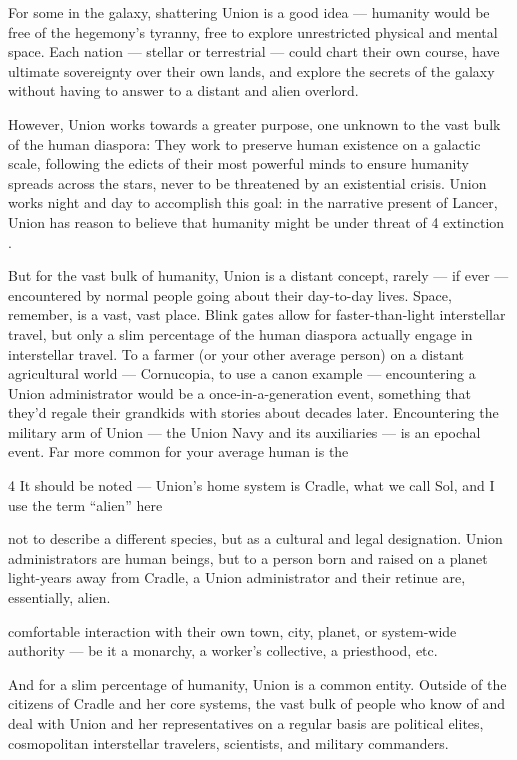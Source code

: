For some in the galaxy, shattering Union is a good idea — humanity would be free of the
hegemony’s tyranny, free to explore unrestricted physical and mental space. Each nation —
stellar or terrestrial — could chart their own course, have ultimate sovereignty over their own
lands, and explore the secrets of the galaxy without having to answer to a distant and alien
overlord.


However, Union works towards a greater purpose, one unknown to the vast bulk of the human
diaspora: They work to preserve human existence on a galactic scale, following the edicts of
their most powerful minds to ensure humanity spreads across the stars, never to be threatened
by an existential crisis. Union works night and day to accomplish this goal: in the narrative
present of Lancer, Union has reason to believe that humanity might be under threat of
            4
extinction  .

But for the vast bulk of humanity, Union is a distant concept, rarely — if ever — encountered by
normal people going about their day-to-day lives. Space, remember, is a vast, vast place. Blink
gates allow for faster-than-light interstellar travel, but only a slim percentage of the human
diaspora actually engage in interstellar travel. To a farmer (or your other average person) on a
distant agricultural world — Cornucopia, to use a canon example — encountering a Union
administrator would be a once-in-a-generation event, something that they’d regale their
grandkids with stories about decades later. Encountering the military arm of Union — the Union
Navy and its auxiliaries — is an epochal event. Far more common for your average human is the

4 It should be noted — Union’s home system is Cradle, what we call Sol, and I use the term “alien” here

not to describe a different species, but as a cultural and legal designation. Union administrators are human
beings, but to a person born and raised on a planet light-years away from Cradle, a Union administrator
and their retinue are, essentially, alien.




comfortable interaction with their own town, city, planet, or system-wide authority — be it a
monarchy, a worker’s collective, a priesthood, etc.


And for a slim percentage of humanity, Union is a common entity. Outside of the citizens of
Cradle and her core systems, the vast bulk of people who know of and deal with Union and her
representatives on a regular basis are political elites, cosmopolitan interstellar travelers,
scientists, and military commanders.


